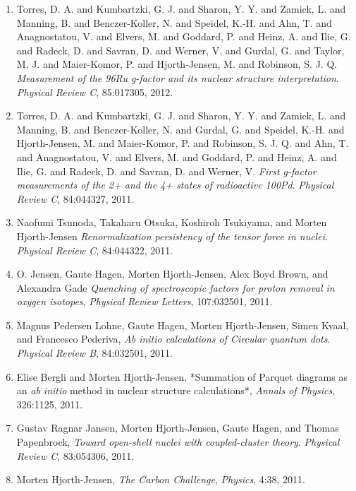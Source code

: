 \documentclass[a4wide,10pt]{article}
\begin{document}
\begin{enumerate}
\item Torres, D. A. and Kumbartzki, G. J. and Sharon, Y. Y. and Zamick, 	L. and Manning, B. and Benczer-Koller, N. and Speidel, K.-H. and 	Ahn, T. and Anagnostatou, V. and Elvers, M. and Goddard, P. and Heinz, 	A. and Ilie, G. and Radeck, D. and Savran, D. and Werner, V. and 	Gurdal, G. and Taylor, M. J. and Maier-Komor, P. and Hjorth-Jensen, 	M. and Robinson, S. J. Q.  \emph{Measurement of the 96Ru g-factor and its nuclear structure interpretation}.  \emph{Physical Review C}, 85:017305, 2012.  

\item Torres, D. A. and Kumbartzki, G. J. and Sharon, Y. Y. and Zamick, 	L. and Manning, B. and Benczer-Koller, N. and Gurdal, G. and Speidel, 	K.-H. and Hjorth-Jensen, M. and Maier-Komor, P. and Robinson, S. J. Q. and Ahn, T. and Anagnostatou, V. and Elvers, M. and Goddard, 	P. and Heinz, A. and Ilie, G. and Radeck, D. and Savran, D. and Werner, V.  \emph{First g-factor measurements of the 2+ and the 4+ states of radioactive 100Pd}.  \emph{Physical Review C}, 84:044327, 2011.  

\item Naofumi Tsunoda, Takaharu Otsuka, Koshiroh Tsukiyama, and Morten Hjorth-Jensen  \emph{Renormalization persistency of the tensor force in nuclei}.  \emph{Physical Review C}, 84:044322, 2011.  

\item O. Jensen, Gaute Hagen, Morten Hjorth-Jensen, Alex Boyd Brown, and Alexandra Gade  \emph{Quenching of spectroscopic factors for proton removal in oxygen isotopes},   \emph{Physical Review Letters}, 107:032501, 2011. 

\item Magnus Pedersen Lohne, Gaute Hagen, Morten Hjorth-Jensen, Simen Kvaal, and Francesco Pederiva,  \emph{Ab initio calculations of Circular quantum dots}.  \emph{Physical Review B}, 84:032501, 2011.    

\item Elise Bergli and Morten Hjorth-Jensen,  *Summation of Parquet diagrams as an \emph{ab initio} method in nuclear structure calculations*,  \emph{Annals of Physics}, 326:1125, 2011.   

\item Gustav Ragnar Jansen, Morten Hjorth-Jensen, Gaute Hagen, and Thomas Papenbrock,  \emph{Toward open-shell nuclei with coupled-cluster theory}.  \emph{Physical Review C}, 83:054306, 2011. 

\item Morten Hjorth-Jensen,  \emph{The Carbon Challenge},  \emph{Physics}, 4:38, 2011.  


\end{enumerate}
\end{document}
